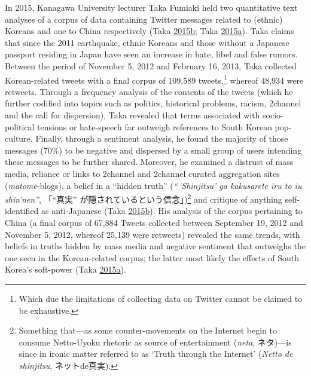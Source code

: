 \documentclass[10pt,british,A4paper,,openany]{memoir}
\begin{document}
In 2015, Kanagawa University lecturer Taka Fumiaki held two quantitative
text analyses of a corpus of data containing Twitter messages related to
(ethnic) Koreans and one to China respectively (Taka
\protect\hyperlink{ref-taka_twitter_2015-1}{2015}\protect\hyperlink{ref-taka_twitter_2015-1}{b};
Taka
\protect\hyperlink{ref-taka_twitter_2015}{2015}\protect\hyperlink{ref-taka_twitter_2015}{a}).
Taka claims that since the 2011 earthquake, ethnic Koreans and those
without a Japanese passport residing in Japan have seen an increase in
hate, libel and false rumors. Between the period of November 5, 2012 and
February 16, 2013, Taka collected Korean-related tweets with a final
corpus of 109,589 tweets,\footnote{Which due the limitations of
  collecting data on Twitter cannot be claimed to be exhaustive.}
whereof 48,934 were retweets. Through a frequency analysis of the
contents of the tweets (which he further codified into topics such as
politics, historical problems, racism, 2channel and the call for
dispersion), Taka revealed that terms associated with socio-political
tensions or hate-speech far outweigh references to South Korean
pop-culture. Finally, through a sentiment analysis, he found the
majority of those messages (70\%) to be negative and dispersed by a
small group of users intending these messages to be further shared.
Moreover, he examined a distrust of mass media, reliance or links to
2channel and 2channel curated aggregation sites (\emph{matome}-blogs), a
belief in a ``hidden truth'' (\emph{``\,`Shinjitsu' ga kakusarete iru to
iu shin'nen''}, 「``真実'' が隠されているという信念」)\footnote{Something
  that---as some counter-movements on the Internet begin to consume
  Netto-Uyoku rhetoric as source of entertainment (\emph{neta},
  ネタ)---is since in ironic matter referred to as `Truth through the
  Internet' (\emph{Netto de shinjitsu}, ネットde真実).} and critique of
anything self-identified as anti-Japanese (Taka
\protect\hyperlink{ref-taka_twitter_2015-1}{2015}\protect\hyperlink{ref-taka_twitter_2015-1}{b}).
His analysis of the corpus pertaining to China (a final corpus of 67,884
Tweets collected between September 19, 2012 and November 5, 2012,
whereof 25,139 were retweets) revealed the same trends, with beliefs in
truths hidden by mass media and negative sentiment that outweighs the
one seen in the Korean-related corpus; the latter most likely the
effects of South Korea's soft-power (Taka
\protect\hyperlink{ref-taka_twitter_2015}{2015}\protect\hyperlink{ref-taka_twitter_2015}{a}).
\end{document}
